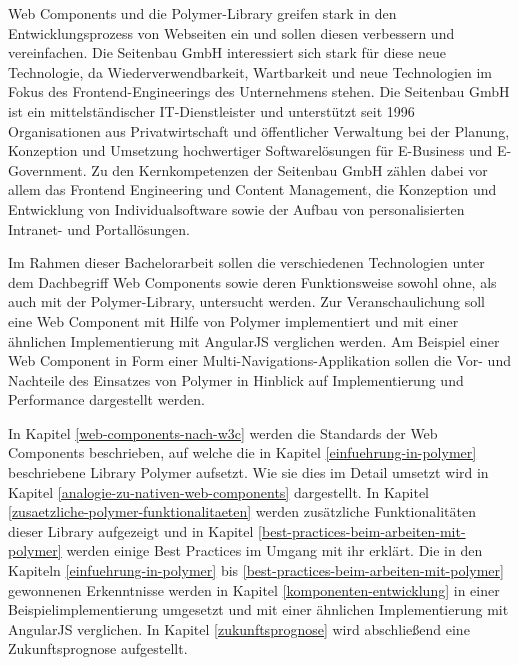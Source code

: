 Web Components und die Polymer-Library greifen stark in den Entwicklungsprozess von Webseiten ein und sollen diesen verbessern und vereinfachen. Die Seitenbau GmbH interessiert sich stark für diese neue Technologie, da Wiederverwendbarkeit, Wartbarkeit und neue Technologien im Fokus des Frontend-Engineerings des Unternehmens stehen.
Die Seitenbau GmbH ist ein mittelständischer IT-Dienstleister und unterstützt seit 1996 Organisationen aus Privatwirtschaft und öffentlicher Verwaltung bei der Planung, Konzeption und Umsetzung hochwertiger Softwarelösungen für E-Business und E-Government. Zu den Kernkompetenzen der Seitenbau GmbH zählen dabei vor allem das Frontend Engineering und Content Management, die Konzeption und Entwicklung von Individualsoftware sowie der Aufbau von personalisierten Intranet- und Portallösungen.

Im Rahmen dieser Bachelorarbeit sollen die verschiedenen Technologien unter dem Dachbegriff Web Components sowie deren Funktionsweise sowohl ohne, als auch mit der Polymer-Library, untersucht werden. Zur Veranschaulichung soll eine Web Component mit Hilfe von Polymer implementiert und mit einer ähnlichen Implementierung mit AngularJS verglichen werden. Am Beispiel einer Web Component in Form einer Multi-Navigations-Applikation sollen die Vor- und Nachteile des Einsatzes von Polymer in Hinblick auf Implementierung und Performance dargestellt werden.

In Kapitel \ref{web-components-nach-w3c} werden die Standards der Web Components beschrieben, auf welche die in Kapitel \ref{einfuehrung-in-polymer} beschriebene Library Polymer aufsetzt. Wie sie dies im Detail umsetzt wird in Kapitel \ref{analogie-zu-nativen-web-components} dargestellt. In Kapitel \ref{zusaetzliche-polymer-funktionalitaeten} werden zusätzliche Funktionalitäten dieser Library aufgezeigt und in Kapitel \ref{best-practices-beim-arbeiten-mit-polymer} werden einige Best Practices im Umgang mit ihr erklärt. Die in den Kapiteln \ref{einfuehrung-in-polymer} bis \ref{best-practices-beim-arbeiten-mit-polymer} gewonnenen Erkenntnisse werden in Kapitel \ref{komponenten-entwicklung} in einer Beispielimplementierung umgesetzt und mit einer ähnlichen Implementierung mit AngularJS verglichen. In Kapitel \ref{zukunftsprognose} wird abschließend eine Zukunftsprognose aufgestellt.
